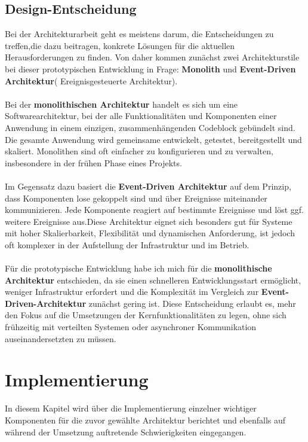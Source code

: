 \documentclass[a4paper,12pt]{scrreprt}
\begin{document}
\clearpage
\section{Design-Entscheidung}
Bei der Architekturarbeit geht es meistens darum, die Entscheidungen zu treffen,die dazu beitragen, konkrete Lösungen für die aktuellen Herausforderungen zu finden. Von daher kommen zunächst zwei Architekturstile bei dieser prototypischen Entwicklung in Frage: \textbf{Monolith} und \textbf{Event-Driven Architektur}( Ereignisgesteuerte Architektur).\\ \\
Bei der \textbf{monolithischen Architektur}  handelt es sich um eine Softwarearchitektur, bei der alle Funktionalitäten und Komponenten einer Anwendung in einem einzigen, zusammenhängenden Codeblock gebündelt sind. Die gesamte Anwendung wird gemeinsame entwickelt, getestet, bereitgestellt und skaliert. Monolithen sind oft einfacher zu konfigurieren und zu verwalten, insbesondere in der frühen Phase eines Projekts. \\ \\
Im Gegensatz dazu basiert die \textbf{Event-Driven Architektur} auf dem Prinzip, dass Komponenten lose gekoppelt sind und über Ereignisse miteinander kommunizieren. Jede Komponente reagiert auf bestimmte Ereignisse und löst ggf. weitere Ereignisse aus.Diese Architektur eignet sich besonders gut für Systeme mit hoher Skalierbarkeit, Flexibilität  und dynamischen Anforderung, ist jedoch oft komplexer in der Aufstellung der Infrastruktur und im Betrieb.\\ \\
Für die prototypische Entwicklung habe ich mich für die \textbf{monolithische Architektur} entschieden, da sie einen schnelleren Entwicklungsstart ermöglicht, weniger Infrastruktur erfordert und die Komplexität im Vergleich zur \textbf{Event-Driven-Architektur} zunächst gering ist. Diese Entscheidung erlaubt es, mehr den Fokus auf die Umsetzungen der Kernfunktionalitäten zu legen, ohne sich frühzeitig mit verteilten Systemen oder asynchroner Kommunikation auseinandersetzten zu müssen. 
	
	
\chapter{Implementierung}
In diesem Kapitel wird über die Implementierung einzelner wichtiger Komponenten für die zuvor gewählte Architektur berichtet und ebenfalls auf während der Umsetzung auftretende Schwierigkeiten eingegangen. 
\end{document}
